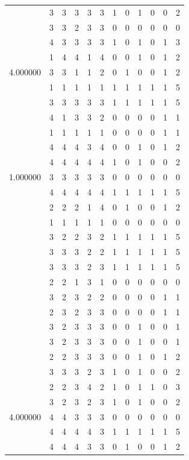 \documentclass[]{book}
\theoremstyle{definition}
\theoremstyle{definition}
\theoremstyle{definition}
\theoremstyle{remark}
\begin{document}
\begin{table}
{\begin{tabular}[t]{rrrrrrrrrrrr}
 & 3 & 3 & 3 & 3 & 3 & 1 & 0 & 1 & 0 & 0 & 2\\
 & 3 & 3 & 2 & 3 & 3 & 0 & 0 & 0 & 0 & 0 & 0\\
 & 4 & 3 & 3 & 3 & 3 & 1 & 0 & 1 & 0 & 1 & 3\\
 & 1 & 4 & 4 & 1 & 4 & 0 & 0 & 1 & 0 & 1 & 2\\
4.000000 & 3 & 3 & 1 & 1 & 2 & 0 & 1 & 0 & 0 & 1 & 2\\
 & 1 & 1 & 1 & 1 & 1 & 1 & 1 & 1 & 1 & 1 & 5\\
 & 3 & 3 & 3 & 3 & 3 & 1 & 1 & 1 & 1 & 1 & 5\\
 & 4 & 1 & 3 & 3 & 2 & 0 & 0 & 0 & 0 & 1 & 1\\
 & 1 & 1 & 1 & 1 & 1 & 0 & 0 & 0 & 0 & 1 & 1\\
 & 4 & 4 & 4 & 3 & 4 & 0 & 0 & 1 & 0 & 1 & 2\\
 & 4 & 4 & 4 & 4 & 4 & 1 & 0 & 1 & 0 & 0 & 2\\
1.000000 & 3 & 3 & 3 & 3 & 3 & 0 & 0 & 0 & 0 & 0 & 0\\
 & 4 & 4 & 4 & 4 & 4 & 1 & 1 & 1 & 1 & 1 & 5\\
 & 2 & 2 & 2 & 1 & 4 & 0 & 1 & 0 & 0 & 1 & 2\\
 & 1 & 1 & 1 & 1 & 1 & 0 & 0 & 0 & 0 & 0 & 0\\
 & 3 & 2 & 2 & 3 & 2 & 1 & 1 & 1 & 1 & 1 & 5\\
 & 3 & 3 & 3 & 2 & 2 & 1 & 1 & 1 & 1 & 1 & 5\\
 & 3 & 3 & 3 & 2 & 3 & 1 & 1 & 1 & 1 & 1 & 5\\
 & 2 & 2 & 1 & 3 & 1 & 0 & 0 & 0 & 0 & 0 & 0\\
 & 3 & 2 & 3 & 2 & 2 & 0 & 0 & 0 & 0 & 1 & 1\\
 & 2 & 3 & 2 & 3 & 3 & 0 & 0 & 0 & 0 & 1 & 1\\
 & 3 & 2 & 3 & 3 & 3 & 0 & 0 & 1 & 0 & 0 & 1\\
 & 3 & 2 & 3 & 3 & 3 & 0 & 0 & 1 & 0 & 0 & 1\\
 & 2 & 2 & 3 & 3 & 3 & 0 & 0 & 1 & 0 & 1 & 2\\
 & 3 & 3 & 3 & 2 & 3 & 1 & 0 & 1 & 0 & 0 & 2\\
 & 2 & 2 & 3 & 4 & 2 & 1 & 0 & 1 & 1 & 0 & 3\\
 & 3 & 2 & 3 & 2 & 3 & 1 & 0 & 1 & 0 & 0 & 2\\
4.000000 & 4 & 4 & 3 & 3 & 3 & 0 & 0 & 0 & 0 & 0 & 0\\
 & 4 & 4 & 4 & 4 & 3 & 1 & 1 & 1 & 1 & 1 & 5\\
 & 4 & 4 & 4 & 3 & 3 & 0 & 1 & 0 & 0 & 1 & 2\\

\end{tabular}}
\end{table}
\end{document}
